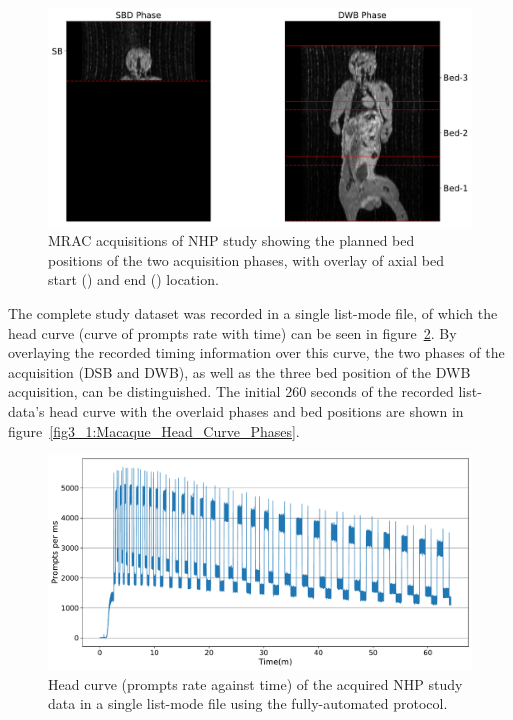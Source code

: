 \begin{figure} [ht!]
\centering
\includegraphics[scale=0.5,angle=0]{3_Results/3_1_DWB_Optimization/figures/3_1_Macaque_MRI.pdf}
\caption{MRAC acquisitions of NHP study showing the planned bed positions of the two acquisition phases, with overlay of axial bed start (\protect{}) and end (\protect{}) location.}
\label{fig3_1:Macaque_MRI}
\end{figure}

The complete study dataset was recorded in a single list-mode file, of which the head curve (curve of prompts rate with time) can be seen in figure~\ref{fig3_1:Macaque_Head_Curve}. By overlaying the recorded timing information over this curve, the two phases of the acquisition (DSB and DWB), as well as the three bed position of the DWB acquisition, can be distinguished. The initial 260 seconds of the recorded list-data's head curve with the overlaid phases and bed positions are shown in figure~\ref{fig3_1:Macaque_Head_Curve_Phases}. 

\begin{figure} [ht!]
\centering
\includegraphics[scale=0.45,angle=0]{3_Results/3_1_DWB_Optimization/figures/3_1_Macaque_Head_Curve.pdf}
\caption{Head curve (prompts rate against time) of the acquired NHP study data in a single list-mode file using the fully-automated protocol.}
\label{fig3_1:Macaque_Head_Curve}
\end{figure}

